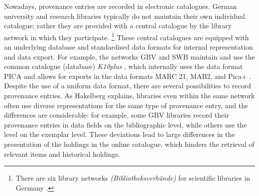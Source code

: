 Nowadays, provenance entries are recorded in electronic catalogues.
German university and research libraries typically do not
maintain their own individual catalogue; rather they are provided with a central
catalogue by the library network in which they participate.%
\footnote{%
  There are six library networks \emph{(Bibliotheksverbünde)} for scientific libraries
  in Germany %
  \autocite{WikiBibliotheksverbundDeutschland}.
}
These central catalogues are equipped with an underlying database
and standardised data formats for internal representation and data export.
For example, the networks GBV and SWB maintain and use the common catalogue (database)
\emph{K10plus} \autocite{K10plus},
which internally uses the data format PICA \autocite{PICA}
and allows for exports in the data formats
MARC 21, MAB2, and Pica+ \autocite{K10plusExportformate}.
Despite the use of a uniform data format,
there are several possibilities to record provenance entries.
As Hakelberg \autocite*[Chapter~4]{Hakelberg2016} explains,
libraries even within the same network often use diverse representations
for the same type of provenance entry, and the differences are considerable:
for example, some GBV libraries record their provenance entries
in data fields on the bibliographic level,
while others use the level on the exemplar level.
These deviations lead to large differences in the presentation
of the holdings in the online catalogue,
which hinders the retrieval of relevant items and historical holdings.

